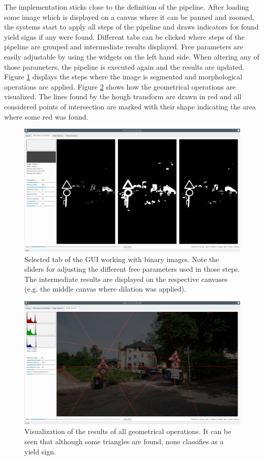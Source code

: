 \documentclass{report}
\begin{document}
The implementation sticks close to the definition of the
pipeline. After loading some image which is displayed on a canvas
where it can be panned and zoomed, the systems start to apply all
steps of the pipeline and draws indicators for found yield signs if
any were found. Different tabs can be clicked where steps of the
pipeline are grouped and intermediate results displayed. Free
parameters are easily adjustable by using the widgets on the left hand
side. When altering any of those parameters, the pipeline is executed
again and the results are updated. Figure \ref{img:gui_morph} displays
the steps where the image is segmented and morphological operations
are applied. Figure \ref{img:gui_hough} shows how the geometrical
operations are visualized. The lines found by the hough transform are
drawn in red and all considered points of intersection are marked with
their shape indicating the area where some red was found.

\begin{figure}
  \centering
    \includegraphics[width=1\textwidth, frame]{src/gui_morph}
  \caption{Selected tab of the GUI working with binary images. Note
    the sliders for adjusting the different free parameters used in
    those steps. The intermediate results are displayed on the
    respective canvases (e.g. the middle canvas where dilation was
    applied). }
  \label{img:gui_morph}
\end{figure}

\begin{figure}
  \centering
    \includegraphics[width=1\textwidth, frame]{src/gui_hough}
  \caption{Visualization of the results of all geometrical
    operations. It can be seen that although some triangles are found,
    none classifies as a yield sign.}
  \label{img:gui_hough}
\end{figure}
\end{document}
